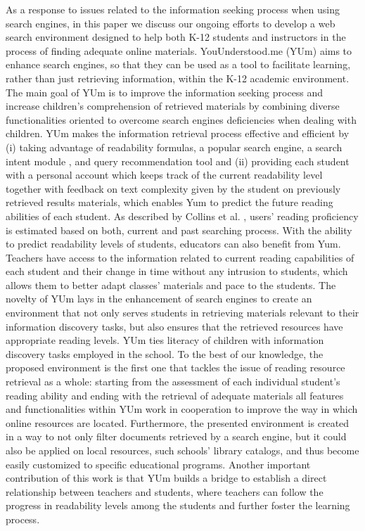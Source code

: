 \documentclass{sig-alternate-05-2015}
\begin{document}
As a response to issues related to the information seeking process when using search engines, in this paper we  discuss our ongoing efforts to develop a web search environment designed to help both K-12 students and instructors in the process of finding adequate online materials. YouUnderstood.me (YUm) aims to enhance search engines, so that they can be used as a tool to facilitate learning, rather than just retrieving information, within the K-12 academic environment. The main goal of YUm is to improve the information seeking process and increase children's comprehension of retrieved materials by combining diverse functionalities oriented to overcome search engines deficiencies when dealing with children. YUm makes the information retrieval process effective and efficient by (i) taking advantage of readability formulas, a popular search engine, a search intent module \cite{SIGIR16}, and query recommendation tool \cite{RecSys16} and (ii) providing each student with a personal account which keeps track of the current readability level together with feedback on text complexity given by the student on previously retrieved results materials, which enables Yum to predict the future reading abilities of each student. As described by Collins et al. \cite{Col11}, users' reading proficiency is estimated based on both, current and past searching process. With the ability to predict readability levels of students, educators can also benefit from Yum. Teachers have access to the information related to current reading capabilities of each student and their change in time without any intrusion to students, which allows them to better adapt classes' materials and pace to the students. 
The novelty of YUm lays in the enhancement of search engines to create an environment that not only serves students in retrieving materials relevant to their information discovery tasks, but also ensures that the retrieved resources have appropriate reading levels. YUm ties literacy of children with information discovery tasks employed in the school. To the best of our knowledge, the proposed environment is the first one that tackles the issue of reading resource retrieval as a whole: starting from the assessment of each individual student's reading ability and ending with the retrieval of adequate materials all features and functionalities within YUm work in cooperation to improve the way in which online resources are located. Furthermore, the presented environment is created in a way to not only filter documents retrieved by a search engine, but it could also be applied on local resources, such schools' library catalogs, and thus become easily customized to specific educational programs. Another important contribution of this work is that YUm builds a bridge to establish a direct relationship between teachers and students, where teachers can follow the progress in readability levels among the students and further foster the learning process.  
\end{document}
